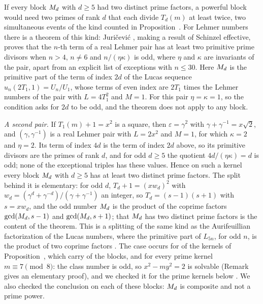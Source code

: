 \begin{remark}
If every block $M_{d}$ with $d \ge 5$ had two distinct prime factors, a powerful block would need two primes of rank $d$ that each divide
$T_d(m)$ at least twice, two simultaneous events of the kind counted in Proposition~. For Lehmer numbers there is a
theorem of this kind: Juri\v{c}evi\'{c} \cite[Theorems~1.1 and~2.1]{Juricevic2007}, making a result of Schinzel effective, proves that the $n$-th
term of a real Lehmer pair has at least two primitive prime divisors when $n > 4$, $n \ne 6$ and $n/(\eta\kappa)$ is odd, where $\eta$ and $\kappa$ are
invariants of the pair, apart from an explicit list of exceptions with $n \le 30$. Here $M_{d}$ is the primitive part of the term of index $2d$ of the Lucas sequence $u_n(2T_1, 1) =
U_n/U_1$, whose terms of even index are $2T_1$ times the Lehmer numbers of the pair with $L = 4T_1^2$ and $M = 1$. For this pair
$\eta = \kappa = 1$, so the condition asks for $2d$ to be odd, and the theorem does not apply to any block.

\emph{A second pair.} If $T_1(m) + 1 = x^2$ is a square, then $\varepsilon = \gamma^2$ with $\gamma + \gamma^{-1} = x\sqrt{2}$, and $(\gamma, \gamma^{-1})$ is a
real Lehmer pair with $L = 2x^2$ and $M = 1$, for which $\kappa = 2$ and $\eta = 2$. Its term of index $4d$ is the term of index $2d$ above, so its
primitive divisors are the primes of rank $d$, and for odd $d \ge 5$ the quotient $4d/(\eta\kappa) = d$ is odd; none of the exceptional triples has
these values. Hence on such a kernel every block $M_{d}$ with $d \ge 5$ has at least two distinct prime factors. The split behind it is elementary: for odd $d$,
$T_d + 1 = (x w_d)^2$ with $w_d = (\gamma^d + \gamma^{-d})/(\gamma + \gamma^{-1})$ an integer, so $T_d = (s - 1)(s + 1)$ with $s = x w_d$, and
the odd number $M_{d}$ is the product of the coprime factors $\gcd(M_{d}, s - 1)$ and $\gcd(M_{d}, s + 1)$; that $M_{d}$ has two
distinct prime factors is the content of the theorem. This is a splitting of the same kind as the Aurifeuillian factorization of the Lucas numbers,
where the primitive part of $L_{5n}$, for odd $n$, is the product of two coprime factors \cite[(2.9)--(2.11)]{BrillhartMontgomerySilverman1988}.
The case occurs
for  of the  kernels of Proposition~, which carry  of the  blocks, and for every prime kernel
$m \equiv 7 \pmod 8$: the class number is odd, so $x^2 - m y^2 = 2$ is solvable (Remark~ gives an elementary proof), and we checked it for the  prime kernels below .
We also checked the conclusion on each of these  blocks: $M_{d}$ is composite and not a prime power.


\end{remark}
